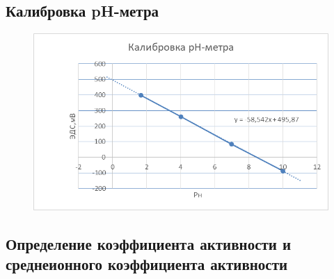 \documentclass[a4paper, 12pt]{article}
\begin{document}
\subsection{Калибровка pH-метра}


\begin{figure}[h]
	\centering
	\caption{}	\includegraphics[width=1\textwidth]{image001.png}
\end{figure}
\newpage
\subsection{Определение коэффициента активности и среднеионного коэффициента активности}
\end{document}
